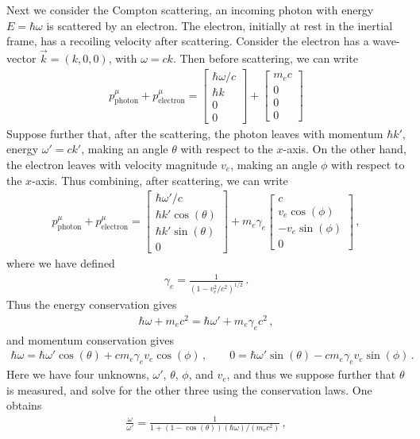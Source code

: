 \documentclass[11pt, onesided]{book}
\theoremstyle{break}
\theoremstyle{break}
\newcommand{\bmat}[1]{\begin{bmatrix} #1 \end{bmatrix}}
\begin{document}
Next we consider the Compton scattering, an incoming photon with energy $E = \hbar \omega$  is scattered by an electron. The electron, initially at rest in the inertial frame, has a recoiling velocity after scattering.  Consider the electron has a wave-vector $\vec{k} = (k,0,0)$, with $\omega = ck$. Then before scattering, we can write
\begin{align*}
p_{\text{photon}}^\mu +p_{\text{electron}}^\mu = \bmat{\hbar \omega/c \\ \hbar k \\ 0\\ 0} + \bmat{m_ec \\ 0 \\ 0\\ 0}
\end{align*}
Suppose further that, after the scattering, the photon leaves with momentum $\hbar k'$, energy $\omega' = ck'$, making an angle $\theta$ with respect to the $x$-axis. On the other hand, the electron leaves with velocity magnitude $v_e$, making an angle $\phi $ with respect to the $x$-axis. Thus combining, after scattering, we can write
\begin{align*}
p_{\text{photon}}^\mu +p_{\text{electron}}^\mu = 
\bmat{\hbar \omega' /c \\ \hbar k' \cos(\theta) \\ \hbar k' \sin(\theta) \\ 0} +
m_e\gamma_e \bmat{c \\ v_e \cos(\phi) \\ -v_e \sin(\phi) \\ 0}\,,
\end{align*}
where we have defined
\begin{align*}
\gamma_e = \frac{1}{(1- v_e^2/c^2)^{1/2}}\,.
\end{align*}
Thus the energy conservation gives
\begin{align*}
\hbar \omega  + m_e c^2  = \hbar\omega'  + m_e \gamma_e c^2\,,
\end{align*}
and momentum conservation gives
\begin{align*}
\hbar \omega = \hbar \omega'\cos(\theta)  +c m_e \gamma_e v_e \cos(\phi) \,,\qquad
0 = \hbar \omega'\sin(\theta) - cm_e \gamma_e v_e \sin(\phi)\,.
\end{align*}
Here we have four unknowns, $\omega'$, $\theta$, $\phi$, and $v_e$, and thus we suppose further that $\theta$ is measured, and solve for the other three using the conservation laws. One obtains
\begin{align*}
\frac{\omega}{\omega'} = \frac{1}{1 + (1-\cos(\theta))(\hbar\omega)/(m_ec^2)}\,,
\end{align*}
\end{document}
